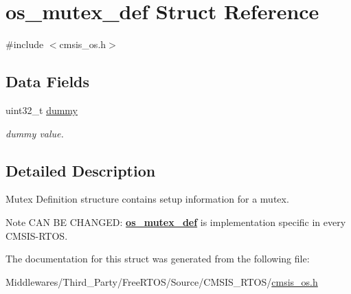 \hypertarget{structos__mutex__def}{}\section{os\+\_\+mutex\+\_\+def Struct Reference}
\label{structos__mutex__def}


{\ttfamily \#include $<$cmsis\+\_\+os.\+h$>$}

\subsection*{Data Fields}
\begin{DoxyCompactItemize}
\item 
\mbox{\label{structos__mutex__def_a44b7a3baf02bac7ad707e8f2f5eca1ca}} 
uint32\+\_\+t \mbox{\hyperlink{structos__mutex__def_a44b7a3baf02bac7ad707e8f2f5eca1ca}{dummy}}
\begin{DoxyCompactList}\small\item\em dummy value. \end{DoxyCompactList}\end{DoxyCompactItemize}


\subsection{Detailed Description}
Mutex Definition structure contains setup information for a mutex. \begin{DoxyNote}{Note}
C\+AN BE C\+H\+A\+N\+G\+ED\+: {\bfseries \mbox{\hyperlink{structos__mutex__def}{os\+\_\+mutex\+\_\+def}}} is implementation specific in every C\+M\+S\+I\+S-\/\+R\+T\+OS. 
\end{DoxyNote}


The documentation for this struct was generated from the following file\+:\begin{DoxyCompactItemize}
\item 
Middlewares/\+Third\+\_\+\+Party/\+Free\+R\+T\+O\+S/\+Source/\+C\+M\+S\+I\+S\+\_\+\+R\+T\+O\+S/\mbox{\hyperlink{cmsis__os_8h}{cmsis\+\_\+os.\+h}}\end{DoxyCompactItemize}
